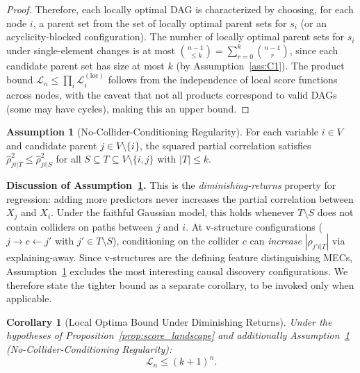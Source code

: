 \documentclass{article}
\theoremstyle{definition}
\newtheorem{assumption}{Assumption}
\theoremstyle{plain}
\newtheorem{corollary}{Corollary}
\theoremstyle{remark}
\begin{document}
\begin{proof}
Therefore, each locally optimal DAG is characterized by choosing, for each node $i$,
a parent set from the set of locally optimal parent sets for $s_i$ (or an
acyclicity-blocked configuration). The number of locally optimal parent sets for $s_i$
under single-element changes is at most $\binom{n-1}{\leq k} = \sum_{r=0}^k \binom{n-1}{r}$,
since each candidate parent set has size at most $k$ (by Assumption~\ref{ass:C1}). The
product bound $\mathcal{L}_n \leq \prod_i \mathcal{L}_i^{(\mathrm{loc})}$ follows from the
independence of local score functions across nodes, with the caveat that not all products
correspond to valid DAGs (some may have cycles), making this an upper bound.
\end{proof}

\begin{assumption}[No-Collider-Conditioning Regularity]
\label{ass:NCC}
For each variable $i \in V$ and candidate parent $j \in V \setminus \{i\}$, the
squared partial correlation satisfies $\hat{\rho}^2_{ji|T} \leq \hat{\rho}^2_{ji|S}$
for all $S \subseteq T \subseteq V \setminus \{i,j\}$ with $|T| \leq k$.
\end{assumption}

\textbf{Discussion of Assumption~\ref{ass:NCC}.} This is the \emph{diminishing-returns}
property for regression: adding more predictors never increases the partial correlation
between $X_j$ and $X_i$. Under the faithful Gaussian model, this holds whenever $T
\setminus S$ does not contain colliders on paths between $j$ and $i$. At v-structure
configurations ($j \to c \leftarrow j'$ with $j' \in T \setminus S$), conditioning on the
collider $c$ can \emph{increase} $|\rho_{j'i|T}|$ via explaining-away. Since v-structures
are the defining feature distinguishing MECs, Assumption~\ref{ass:NCC} excludes the most
interesting causal discovery configurations. We therefore state the tighter bound as a
separate corollary, to be invoked only when applicable.

\begin{corollary}[Local Optima Bound Under Diminishing Returns]
\label{cor:diminishing_returns}
Under the hypotheses of Proposition~\ref{prop:score_landscape} and additionally
Assumption~\ref{ass:NCC} (No-Collider-Conditioning Regularity):
\begin{equation}
  \mathcal{L}_n \leq (k+1)^n.
\end{equation}
\end{corollary}
\end{document}
